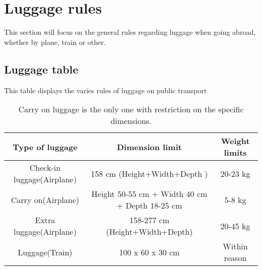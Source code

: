 \section{Luggage rules}
This section will focus on the general rules regarding luggage when going abroad, whether by plane, train or other.

\subsection*{Luggage table}
This table displays the varies rules of luggage on public transport
\begin{table}[H]
\begin{center}
\begin{tabular}{| c | c | c |}
\hline
Type of luggage &  Dimension limit & Weight limits \\ \hline
Check-in luggage(Airplane) & 158 cm (Height+Width+Depth ) & 20-23 kg \\ \hline
Carry on(Airplane) & Height 50-55 cm + Width 40 cm + Depth 18-25 cm & 5-8 kg \\ \hline
Extra luggage(Airplane) & 158-277 cm (Height+Width+Depth) &  20-45 kg \\ \hline
Luggage(Train) & 100 x 60 x 30 cm & Within reason \\ \hline
\end{tabular}
\end{center}
\caption{Carry on luggage is the only one with restriction on the specific dimensions. \citep{General_rules}}
\end{table}

